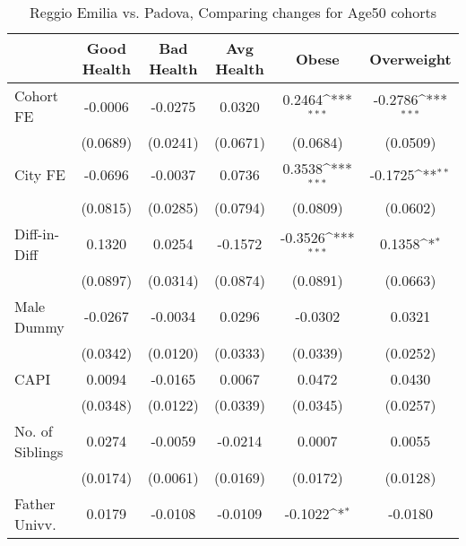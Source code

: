 \begin{table}[htbp]\centering
\def\sym#1{\ifmmode^{#1}\else\(^{#1}\)\fi}
\caption{Reggio Emilia vs. Padova, Comparing changes for Age50 cohorts}
\begin{tabular}{l*{5}{c}}
\toprule
            &\multicolumn{1}{c}{Good Health}&\multicolumn{1}{c}{Bad Health}&\multicolumn{1}{c}{Avg Health}&\multicolumn{1}{c}{Obese}&\multicolumn{1}{c}{Overweight}\\
\midrule
Cohort FE   &     -0.0006         &     -0.0275         &      0.0320         &      0.2464\sym{***}&     -0.2786\sym{***}\\
            &    (0.0689)         &    (0.0241)         &    (0.0671)         &    (0.0684)         &    (0.0509)         \\
\addlinespace
City FE     &     -0.0696         &     -0.0037         &      0.0736         &      0.3538\sym{***}&     -0.1725\sym{**} \\
            &    (0.0815)         &    (0.0285)         &    (0.0794)         &    (0.0809)         &    (0.0602)         \\
\addlinespace
Diff-in-Diff&      0.1320         &      0.0254         &     -0.1572         &     -0.3526\sym{***}&      0.1358\sym{*}  \\
            &    (0.0897)         &    (0.0314)         &    (0.0874)         &    (0.0891)         &    (0.0663)         \\
\addlinespace
Male Dummy  &     -0.0267         &     -0.0034         &      0.0296         &     -0.0302         &      0.0321         \\
            &    (0.0342)         &    (0.0120)         &    (0.0333)         &    (0.0339)         &    (0.0252)         \\
\addlinespace
CAPI        &      0.0094         &     -0.0165         &      0.0067         &      0.0472         &      0.0430         \\
            &    (0.0348)         &    (0.0122)         &    (0.0339)         &    (0.0345)         &    (0.0257)         \\
\addlinespace
No. of Siblings&      0.0274         &     -0.0059         &     -0.0214         &      0.0007         &      0.0055         \\
            &    (0.0174)         &    (0.0061)         &    (0.0169)         &    (0.0172)         &    (0.0128)         \\
\addlinespace
Father Univv.&      0.0179         &     -0.0108         &     -0.0109         &     -0.1022\sym{*}  &     -0.0180         \\

\end{tabular}
\end{table}
